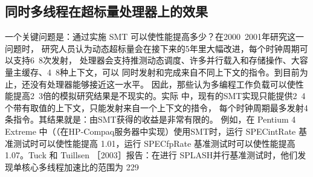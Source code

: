 \subsection{同时多线程在超标量处理器上的效果}
一个关键问题是：通过实施 SMT 可以使性能提高多少？在2000~2001年研究这一问题时，
研究人员认为动态超标量会在接下来的5年里大幅改进，每个时钟周期可以支持6~8次发射，
处理器会支持推测动态调度、许多并行载入和存储操作、大容量主缓存、4~8种上下文，可以
同时发射和完成来自不同上下文的指令。到目前为止，还没有处理器能够接近这一水平。
因此，那些认为多编程工作负载可以使性能提高2~3倍的模拟研究结果是不现实的。实际
中，现有的SMT实现只能提供2~4个带有取值的上下文，只能发射来自一个上下文的措令，
每个时钟周期最多发射4条指令。其结果就是：由SMT获得的收益是非常有限的。
例如，在 Pentium 4 Extreme 中（（在HP-Compaq服务器中实现）使用SMT时，运行 SPECintRate
基准测试时可以使性能提高 1.01，运行 SPECfpRate 基准测试时可以使性能提高1.07。Tuck 和
Tuillsen ［2003］报告：在进行 SPLASH并行基准测试时，他们发现单核心多线程加速比的范围为
229

